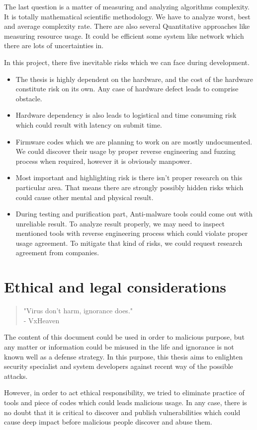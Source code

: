 The last question is a matter of measuring and analyzing algorithms complexity. It is totally mathematical scientific methodology. We have to analyze worst, best and average complexity rate. There are also several Quantitative approaches like measuring resource usage. It could be efficient some system like network which there are lots of uncertainties in.

In this project, there five inevitable risks which we can face during development.

\begin{itemize}
\item The thesis is highly dependent on the hardware, and the cost of the hardware constitute risk on its own. Any case of hardware defect leads to comprise obstacle.
\item Hardware dependency is also leads to logistical and time consuming risk which could result with latency on submit time.
\item Firmware codes which we are planning to work on are mostly undocumented. We could discover their usage by proper reverse engineering and fuzzing process when required, however it is obviously manpower.
\item Most important and highlighting risk is there isn't proper research on this particular area. That means there are strongly possibly hidden risks which could cause other mental and physical result.
\item During testing and purification part, Anti-malware tools could come out with unreliable result. To analyze result properly, we may need to inspect mentioned tools with reverse engineering process which could violate proper usage agreement. To mitigate that kind of risks, we could request research agreement from companies.  
\end{itemize}

\section{Ethical and legal considerations}
\begin{quote}

"Virus don't harm, ignorance does."\\
- VxHeaven
\end{quote}

The content of this document could be used in order to malicious purpose, but any matter or information could be misused in the life and ignorance is not known well as a defense strategy. In this purpose, this thesis aims to enlighten security specialist and system developers against recent way of the possible attacks. 

However, in order to act ethical responsibility, we tried to eliminate practice of tools and piece of codes which could leads malicious usage. In any case, there is no doubt that it is critical to discover and publish vulnerabilities which could cause deep impact before malicious people discover and abuse them.


